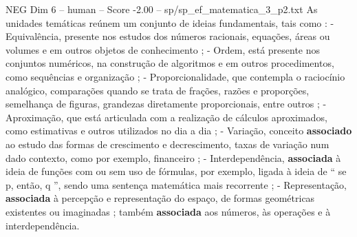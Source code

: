 \begin{textsample}{NEG Dim 6 – human – Score -2.00 – sp/sp\_ef\_matematica\_3\_p2.txt}  \label{ex:f6_neg_014}
As unidades temáticas reúnem um conjunto de ideias fundamentais, tais como : - Equivalência, presente nos estudos dos números racionais, equações, áreas ou volumes e em outros objetos de conhecimento ; - Ordem, está presente nos conjuntos numéricos, na construção de algoritmos e em outros procedimentos, como sequências e organização ; - Proporcionalidade, que contempla o raciocínio analógico, comparações quando se trata de frações, razões e proporções, semelhança de figuras, grandezas diretamente proporcionais, entre outros ; - Aproximação, que está articulada com a realização de cálculos aproximados, como estimativas e outros utilizados no dia a dia ; - Variação, conceito \textbf{associado} ao estudo das formas de crescimento e decrescimento, taxas de variação num dado contexto, como por exemplo, financeiro ; - Interdependência, \textbf{associada} à ideia de funções com ou sem uso de fórmulas, por exemplo, ligada à ideia de “ se p, então, q ”, sendo uma sentença matemática mais recorrente ; - Representação, \textbf{associada} à percepção e representação do espaço, de formas geométricas existentes ou imaginadas ; também \textbf{associada} aos números, às operações e à interdependência.

\end{textsample}
